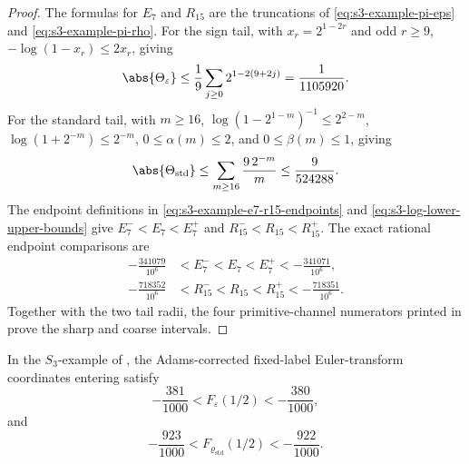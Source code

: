 \begin{proof}
  The formulas for \(E_7\) and \(R_{15}\) are the truncations of
  \eqref{eq:s3-example-pi-eps} and \eqref{eq:s3-example-pi-rho}.  For the sign
  tail, with \(x_r=2^{1-2r}\) and odd \(r\ge9\),
  \(-\log(1-x_r)\le 2x_r\), giving
  \[
    \abs{\Theta_\varepsilon}
    \le \frac19\sum_{j\ge0}2^{1-2(9+2j)}
    =\frac1{1105920}.
  \]
  For the standard tail, with \(m\ge16\),
  \(\log(1-2^{1-m})^{-1}\le 2^{2-m}\),
  \(\log(1+2^{-m})\le 2^{-m}\), \(0\le\alpha(m)\le2\), and
  \(0\le\beta(m)\le1\), giving
  \[
    \abs{\Theta_{\mathrm{std}}}
    \le\sum_{m\ge16}\frac{9\,2^{-m}}{m}
    \le \frac9{524288}.
  \]
  The endpoint definitions in \eqref{eq:s3-example-e7-r15-endpoints} and
  \eqref{eq:s3-log-lower-upper-bounds} give
  \(E_7^-<E_7<E_7^+\) and \(R_{15}^-<R_{15}<R_{15}^+\).  The exact rational
  endpoint comparisons are
  \begin{equation}\label{eq:s3-example-finite-sum-windows}
    \begin{aligned}
      -\frac{341079}{10^6}
      &<E_7^-<E_7<E_7^+<-\frac{341071}{10^6},\\
      -\frac{718352}{10^6}
      &<R_{15}^-<R_{15}<R_{15}^+<-\frac{718351}{10^6}.
    \end{aligned}
  \end{equation}
  Together with the two tail radii, the four primitive-channel numerators
  printed in  prove the
  sharp and coarse intervals.
\end{proof}

\begin{lemma}\label{lem:appendix-s3-f-level-certificates}
  In the \(S_3\)-example of , the Adams-corrected
  fixed-label Euler-transform coordinates entering
   satisfy
  \begin{equation}\label{eq:s3-f-epsilon-appendix-window}
    -\frac{381}{1000}<F_\varepsilon(1/2)<-\frac{380}{1000},
  \end{equation}
  and
  \begin{equation}\label{eq:s3-f-rho-appendix-window}
    -\frac{923}{1000}<F_{\varrho_{\mathrm{std}}}(1/2)<-\frac{922}{1000}.
  \end{equation}
\end{lemma}

